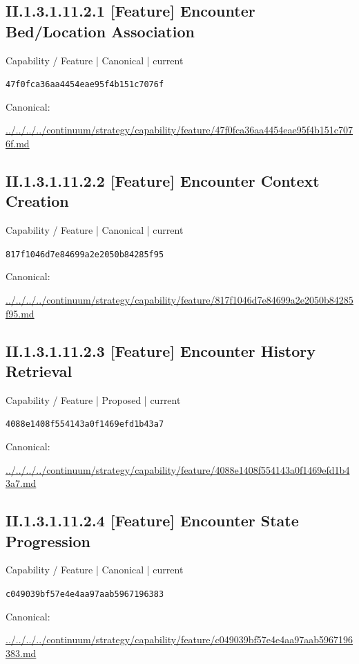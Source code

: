 \documentclass[10pt,a4paper]{article}
\begin{document}
\subsection*{II.1.3.1.11.2.1 [Feature] Encounter Bed/Location Association}
{\small Capability / Feature | Canonical | current}\par
\texttt{47f0fca36aa4454eae95f4b151c7076f}\par
Canonical: \par
{\footnotesize\url{../../../../continuum/strategy/capability/feature/47f0fca36aa4454eae95f4b151c7076f.md}}\par
\subsection*{II.1.3.1.11.2.2 [Feature] Encounter Context Creation}
{\small Capability / Feature | Canonical | current}\par
\texttt{817f1046d7e84699a2e2050b84285f95}\par
Canonical: \par
{\footnotesize\url{../../../../continuum/strategy/capability/feature/817f1046d7e84699a2e2050b84285f95.md}}\par
\subsection*{II.1.3.1.11.2.3 [Feature] Encounter History Retrieval}
{\small Capability / Feature | Proposed | current}\par
\texttt{4088e1408f554143a0f1469efd1b43a7}\par
Canonical: \par
{\footnotesize\url{../../../../continuum/strategy/capability/feature/4088e1408f554143a0f1469efd1b43a7.md}}\par
\subsection*{II.1.3.1.11.2.4 [Feature] Encounter State Progression}
{\small Capability / Feature | Canonical | current}\par
\texttt{c049039bf57e4e4aa97aab5967196383}\par
Canonical: \par
{\footnotesize\url{../../../../continuum/strategy/capability/feature/c049039bf57e4e4aa97aab5967196383.md}}\par
\end{document}
